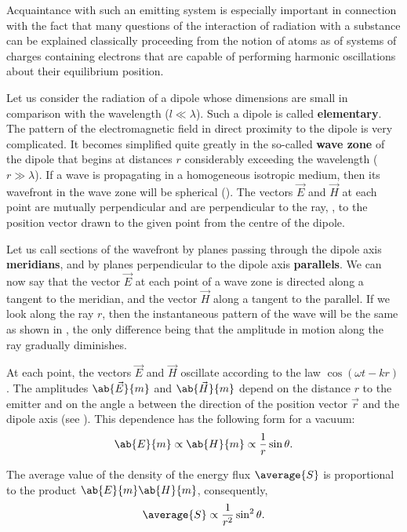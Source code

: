 Acquaintance with such an emitting system is especially important in connection with the fact that many questions of the interaction of radiation with a substance can be explained classically proceeding from the notion of atoms as of systems of charges containing electrons that are capable of performing harmonic oscillations about their equilibrium position.

Let us consider the radiation of a dipole whose dimensions are small in comparison with the wavelength ($l\ll\lambda$).
Such a dipole is called \textbf{elementary}.
The pattern of the electromagnetic field in direct proximity to the dipole is very complicated.
It becomes simplified quite greatly in the so-called \textbf{wave zone} of the dipole that begins at distances $r$ considerably exceeding the wavelength ($r\gg\lambda$).
If a wave is propagating in a homogeneous isotropic medium, then its wavefront in the wave zone will be spherical ().
The vectors $\vec{E}$ and $\vec{H}$ at each point are mutually perpendicular and are perpendicular to the ray, \ie, to the position vector drawn to the given point from the centre of the dipole.

Let us call sections of the wavefront by planes passing through the dipole axis \textbf{meridians}, and by planes perpendicular to the dipole axis \textbf{parallels}.
We can now say that the vector $\vec{E}$ at each point of a wave zone is directed along a tangent to the meridian, and the vector $\vec{H}$ along a tangent to the parallel.
If we look along the ray $r$, then the instantaneous pattern of the wave will be the same as shown in , the only difference being that the amplitude in motion along the ray gradually diminishes.

At each point, the vectors $\vec{E}$ and $\vec{H}$ oscillate according to the law $\cos(\omega t - kr)$.
The amplitudes $\ab{\vec{E}}{m}$ and $\ab{\vec{H}}{m}$ depend on the distance $r$ to the emitter and on the angle a between the direction of the position vector $\vec{r}$ and the dipole axis (see ).
This dependence has the following form for a vacuum:
\begin{equation*}
    \ab{E}{m} \propto \ab{H}{m} \propto \frac{1}{r} \sin\theta.
\end{equation*}

\noindent
The average value of the density of the energy flux $\average{S}$ is proportional to the product $\ab{E}{m}\ab{H}{m}$, consequently,
\begin{equation}\label{eq:15_43}
    \average{S} \propto \frac{1}{r^2} \sin^2\theta.
\end{equation}

